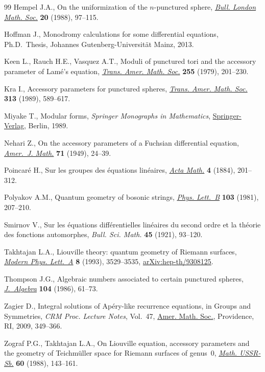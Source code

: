 \documentclass[pdftex]{sigma}
\numberwithin{equation}{section}
\begin{document}
\begin{thebibliography}{99}
Hempel J.A., On the uniformization of the {$n$}-punctured sphere, \href{https://doi.org/10.1112/blms/20.2.97}{\textit{Bull.
 London Math. Soc.}} \textbf{20} (1988), 97--115.

Hoffman J., Monodromy calculations for some differential equations, Ph.D.~Thesis, {J}ohannes Gutenberg-Universit\"at Mainz, 2013.

Keen L., Rauch H.E., Vasquez A.T., Moduli of punctured tori and the accessory
 parameter of {L}am\'e's equation, \href{https://doi.org/10.2307/1998172}{\textit{Trans. Amer. Math. Soc.}}
 \textbf{255} (1979), 201--230.

Kra I., Accessory parameters for punctured spheres, \href{https://doi.org/10.2307/2001420}{\textit{Trans. Amer. Math.
 Soc.}} \textbf{313} (1989), 589--617.

Miyake T., Modular forms, \textit{Springer Monographs in Mathematics}, \href{https://doi.org/10.1007/3-540-29593-3}{Springer-Verlag},
 Berlin, 1989.

Nehari Z., On the accessory parameters of a {F}uchsian differential equation,
 \href{https://doi.org/10.2307/2372089}{\textit{Amer.~J. Math.}} \textbf{71} (1949), 24--39.

Poincar\'e H., Sur les groupes des \'equations lin\'eaires, \href{https://doi.org/10.1007/BF02418420}{\textit{Acta Math.}}
 \textbf{4} (1884), 201--312.

Polyakov A.M., Quantum geometry of bosonic strings, \href{https://doi.org/10.1016/0370-2693(81)90743-7}{\textit{Phys. Lett.~B}}
 \textbf{103} (1981), 207--210.

Smirnov V., Sur les \'equations diff\'erentielles lin\'eaires du second ordre et la th\'eorie des fonctions automorphes, \textit{Bull. Sci. Math.} \textbf{45} (1921), 93--120.

Takhtajan L.A., Liouville theory: quantum geometry of {R}iemann surfaces,
 \href{https://doi.org/10.1142/S0217732393002269}{\textit{Modern Phys. Lett.~A}} \textbf{8} (1993), 3529--3535,
 \href{https://arxiv.org/abs/hep-th/9308125}{arXiv:hep-th/9308125}.

Thompson J.G., Algebraic numbers associated to certain punctured spheres,
 \href{https://doi.org/10.1016/0021-8693(86)90234-6}{\textit{J.~Algebra}} \textbf{104} (1986), 61--73.

Zagier D., Integral solutions of {A}p\'ery-like recurrence equations, in Groups
 and Symmetries, \textit{CRM Proc. Lecture Notes}, Vol.~47, \href{https://doi.org/10.1090/crmp/047/22}{Amer. Math. Soc.},
 Providence, RI, 2009, 349--366.

Zograf P.G., Takhtajan L.A., On {L}iouville equation, accessory parameters
 and the geometry of {T}eichm\"uller space for {R}iemann surfaces of
 genus~{$0$}, \href{https://doi.org/10.1070/SM1988v060n01ABEH003160}{\textit{Math. USSR-Sb.}} \textbf{60} (1988), 143--161.

\end{thebibliography}\LastPageEnding
\end{document}
